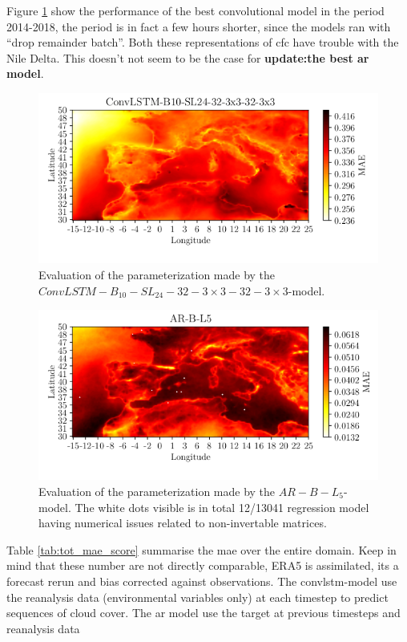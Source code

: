 Figure \ref{fig:MAE_convlstm} show the performance of the best convolutional model in the period 2014-2018, the period is in fact a few hours shorter, since the models ran with ``drop remainder batch''. Both these representations of \acrshort{cfc} have trouble with the Nile Delta. This doesn't not seem to be the case for \textbf{update:the best ar model}.
\begin{figure}
    \centering
    \includegraphics{python_figs/mae_convlstm_vs_target_test_period_2014_to_2018.png}
    \caption{Evaluation of the parameterization made by the $ConvLSTM-B_{10}-SL_{24}-32-3\times3-32-3 \times3$-model.}
    \label{fig:MAE_convlstm}
\end{figure}

\begin{figure}
    \centering
    \includegraphics{python_figs/mea_best_ar_model_tcc_L5_in_folder_AR-B-L5.png}
    \caption{Evaluation of the parameterization made by the $AR-B-L_5$-model. The white dots visible is in total 12/13041 regression model having numerical issues related to non-invertable matrices.}
    \label{fig:MAE_AR}
\end{figure}

Table \ref{tab:tot_mae_score} summarise the \acrshort{mae} over the entire domain. Keep in mind that these number are not directly comparable, ERA5 is assimilated, its a forecast rerun and bias corrected against observations. The \acrshort{convlstm}-model use the reanalysis data (environmental variables only) at each timestep to predict sequences of cloud cover. The ar model use the target at previous timesteps and reanalysis data 

